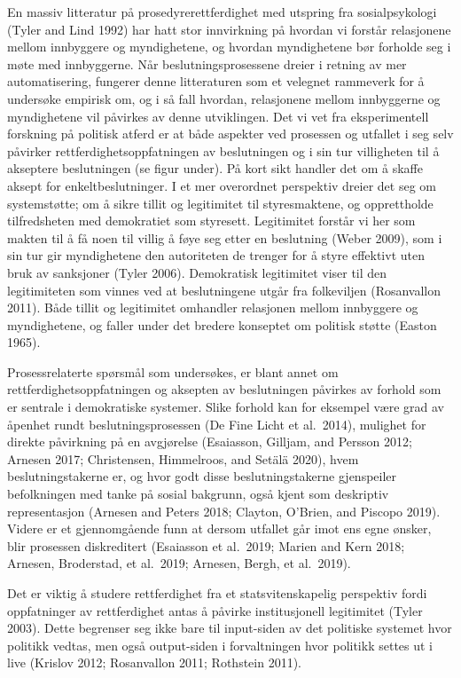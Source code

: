\documentclass[
]{book}
\begin{document}
En massiv litteratur på prosedyrerettferdighet med utspring fra sosialpsykologi (Tyler and Lind 1992) har hatt stor innvirkning på hvordan vi forstår relasjonene mellom innbyggere og myndighetene, og hvordan myndighetene bør forholde seg i møte med innbyggerne.
Når beslutningsprosessene dreier i retning av mer automatisering, fungerer denne litteraturen som et velegnet rammeverk for å undersøke empirisk om, og i så fall hvordan, relasjonene mellom innbyggerne og myndighetene vil påvirkes av denne utviklingen.
Det vi vet fra eksperimentell forskning på politisk atferd er at både aspekter ved prosessen og utfallet i seg selv påvirker rettferdighetsoppfatningen av beslutningen og i sin tur villigheten til å akseptere beslutningen (se figur under).
På kort sikt handler det om å skaffe aksept for enkeltbeslutninger.
I et mer overordnet perspektiv dreier det seg om systemstøtte; om å sikre tillit og legitimitet til styresmaktene, og opprettholde tilfredsheten med demokratiet som styresett.
Legitimitet forstår vi her som makten til å få noen til villig å føye seg etter en beslutning (Weber 2009), som i sin tur gir myndighetene den autoriteten de trenger for å styre effektivt uten bruk av sanksjoner (Tyler 2006).
Demokratisk legitimitet viser til den legitimiteten som vinnes ved at beslutningene utgår fra folkeviljen (Rosanvallon 2011).
Både tillit og legitimitet omhandler relasjonen mellom innbyggere og myndighetene, og faller under det bredere konseptet om politisk støtte (Easton 1965).

Prosessrelaterte spørsmål som undersøkes, er blant annet om rettferdighetsoppfatningen og aksepten av beslutningen påvirkes av forhold som er sentrale i demokratiske systemer.
Slike forhold kan for eksempel være grad av åpenhet rundt beslutningsprosessen (De Fine Licht et al.~2014), mulighet for direkte påvirkning på en avgjørelse (Esaiasson, Gilljam, and Persson 2012; Arnesen 2017; Christensen, Himmelroos, and Setälä 2020), hvem beslutningstakerne er, og hvor godt disse beslutningstakerne gjenspeiler befolkningen med tanke på sosial bakgrunn, også kjent som deskriptiv representasjon (Arnesen and Peters 2018; Clayton, O'Brien, and Piscopo 2019). Videre er et gjennomgående funn at dersom utfallet går imot ens egne ønsker, blir prosessen diskreditert (Esaiasson et al.~2019; Marien and Kern 2018; Arnesen, Broderstad, et al.~2019; Arnesen, Bergh, et al.~2019).

Det er viktig å studere rettferdighet fra et statsvitenskapelig perspektiv fordi oppfatninger av rettferdighet antas å påvirke institusjonell legitimitet (Tyler 2003). Dette begrenser seg ikke bare til input-siden av det politiske systemet hvor politikk vedtas, men også output-siden i forvaltningen hvor politikk settes ut i live (Krislov 2012; Rosanvallon 2011; Rothstein 2011).
\end{document}
